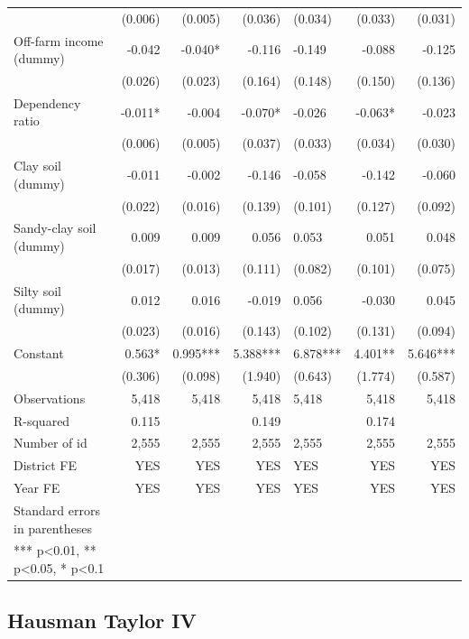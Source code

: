 \documentclass[
]{article}
\begin{document}
\begin{landscape}
\begin{longtable}[t]{lrrrlrr}
 & (0.006) & (0.005) & (0.036) & (0.034) & (0.033) & (0.031)\\
Off-farm income (dummy) & -0.042 & -0.040* & -0.116 & -0.149 & -0.088 & -0.125\\
 & (0.026) & (0.023) & (0.164) & (0.148) & (0.150) & (0.136)\\
Dependency ratio & -0.011* & -0.004 & -0.070* & -0.026 & -0.063* & -0.023\\
 & (0.006) & (0.005) & (0.037) & (0.033) & (0.034) & (0.030)\\
Clay soil (dummy) & -0.011 & -0.002 & -0.146 & -0.058 & -0.142 & -0.060\\
 & (0.022) & (0.016) & (0.139) & (0.101) & (0.127) & (0.092)\\
Sandy-clay soil (dummy) & 0.009 & 0.009 & 0.056 & 0.053 & 0.051 & 0.048\\
 & (0.017) & (0.013) & (0.111) & (0.082) & (0.101) & (0.075)\\
Silty soil (dummy) & 0.012 & 0.016 & -0.019 & 0.056 & -0.030 & 0.045\\
 & (0.023) & (0.016) & (0.143) & (0.102) & (0.131) & (0.094)\\
Constant & 0.563* & 0.995*** & 5.388*** & 6.878*** & 4.401** & 5.646***\\
 & (0.306) & (0.098) & (1.940) & (0.643) & (1.774) & (0.587)\\
Observations & 5,418 & 5,418 & 5,418 & 5,418 & 5,418 & 5,418\\
R-squared & 0.115 &  & 0.149 &  & 0.174 & \\
Number of id & 2,555 & 2,555 & 2,555 & 2,555 & 2,555 & 2,555\\
District FE & YES & YES & YES & YES & YES & YES\\
Year FE & YES & YES & YES & YES & YES & YES\\
Standard errors in parentheses &  &  &  &  &  & \\
*** p<0.01, ** p<0.05, * p<0.1 &  &  &  &  &  & \\*
\end{longtable}
\endgroup{}
\end{landscape}
\newpage

\hypertarget{hausman-taylor-iv}{%
\subsection{Hausman Taylor IV}\label{hausman-taylor-iv}}

\begingroup\fontsize{7}{9}\selectfont
\end{document}
